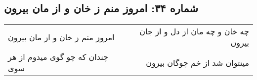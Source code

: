 \begin{center}
\section*{شماره ۳۴: امروز منم ز خان و از مان بیرون}
\label{sec:034}
\begin{longtable}{l p{0.5cm} r}
امروز منم ز خان و از مان بیرون
&&
چه خان و چه مان از دل و از جان بیرون
\\
چندان که چو گوی میدوم از هر سوی
&&
مینتوان شد از خم چوگان بیرون
\\
\end{longtable}
\end{center}
